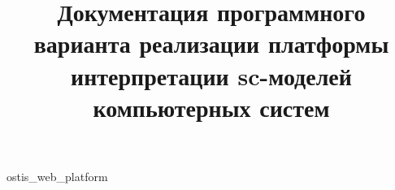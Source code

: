 \documentclass[graybox,envcountchap,sectrefs]{scn/svmono}
\begin{document}
\DeactivateBG
\title{\centering
Документация программного варианта реализации платформы интерпретации sc-моделей компьютерных систем}
\maketitle

\normalsize

\setcounter{page}{3}

\ActivateBG

\addtocounter{chapter}{-1}

\begin{SCn}
{ostis_web_platform}

\end{SCn}


\backmatter
\end{document}

